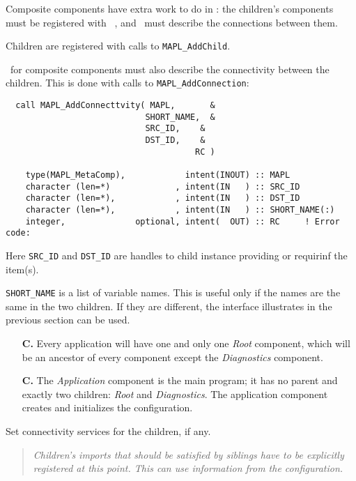 Composite components have extra work to do in \ssv: the children's components
must be registered with \ggn\  , and \ssv\  must describe
the connections between them.

Children are registered with calls to {\tt MAPL_AddChild}.

\ssv\  for composite components must also describe the connectivity
between the children. This is done with calls to {\tt  MAPL\_AddConnection}:

\begin{verbatim}
  call MAPL_AddConnecttvity( MAPL,       &
                            SHORT_NAME,  &
                            SRC_ID,    &
                            DST_ID,    &
                                      RC )

    type(MAPL_MetaComp),            intent(INOUT) :: MAPL
    character (len=*)             , intent(IN   ) :: SRC_ID
    character (len=*),            , intent(IN   ) :: DST_ID
    character (len=*),            , intent(IN   ) :: SHORT_NAME(:)
    integer,              optional, intent(  OUT) :: RC     ! Error code:
\end{verbatim}

Here {\tt SRC_ID} and {\tt DST_ID} are handles to child instance
providing or requirinf the item(s).

{\tt SHORT_NAME}  is a list of variable names. This is useful only
if the names are the same in the two children. If they are different,
the interface illustrates in the previous section can be used.





\begin{itemize}
\item[{\bf C.\thegenct}] Every \ggn  application will have one and only
  one {\em Root} component, which will be an ancestor of every
  component except the {\em Diagnostics} component.
\addtocounter{genct}{1}

\item[{\bf C.\thegenct}] The {\em Application} component is the
  main program; it has no parent and exactly two children: {\em Root}
  and {\em Diagnostics}. The application component creates and
  initializes the configuration.
\addtocounter{genct}{1}
\end{itemize}


\item Set connectivity services for the children, if any.
\begin{quote} 
{\em Children's imports that should be satisfied by siblings have
 to be explicitly registered at this point. This can use information from the
 configuration.}
\end{quote}




